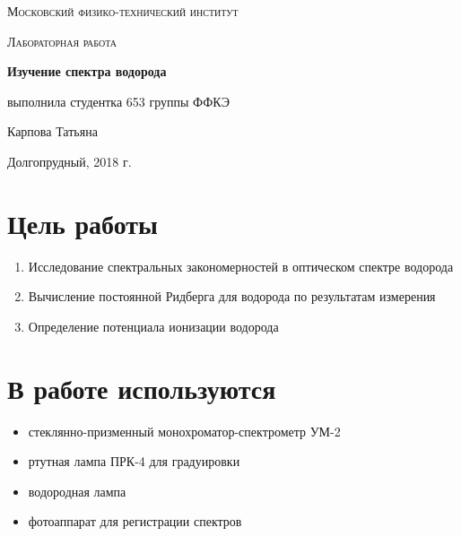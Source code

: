 \documentclass[a4paper]{article}
\begin{document}
\begin{titlepage}
	\centering
	\vspace{5cm}
	{\scshape\LARGE Московский физико-технический институт \par}
	\vspace{4cm}
	{\scshape\Large Лабораторная работа \par}
	\vspace{1cm}
	{\huge\bfseries Изучение спектра водорода \par}
	\vspace{1cm}
	\vfill
\begin{flushright}
	{\large выполнила студентка 653 группы ФФКЭ}\par
	\vspace{0.3cm}
	{\LARGE Карпова Татьяна} \par

\end{flushright}
	

	\vfill

	Долгопрудный, 2018 г.
\end{titlepage}


\section{Цель работы}
\begin{enumerate}
    \item Исследование спектральных закономерностей в оптическом спектре водорода
    \item Вычисление постоянной Ридберга для водорода по результатам измерения
    \item Определение потенциала ионизации водорода
\end{enumerate}

\section{В работе используются}
\begin{itemize}
    \item стеклянно-призменный монохроматор-спектрометр УМ-2
    \item ртутная лампа ПРК-4 для градуировки 
    \item водородная лампа
    \item фотоаппарат для регистрации спектров
\end{itemize}
\end{document}
